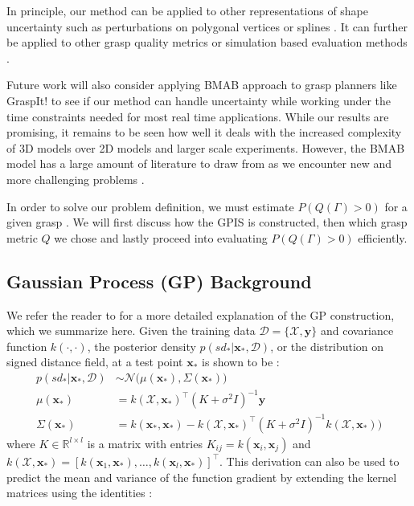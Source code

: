 \documentclass[journal,transmag]{IEEEtran}%
\newcommand{\by}{\mathbf{y}}
\newcommand{\bx}{\mathbf{x}}
\newcommand{\mX}{\mathcal{X}}
\newcommand{\mD}{\mathcal{D}}
\newcommand{\mN}{\mathcal{N}}
\begin{document}
In principle, our method can be applied to other representations of shape uncertainty such as perturbations on polygonal vertices \cite{kehoe2012estimating} or splines \cite{christopoulos2007handling}.
It can further be applied to other grasp quality metrics or simulation based evaluation methods \cite{73}. 

Future work will also consider applying BMAB approach to grasp planners like GraspIt! \cite{miller2004graspit} to see if our method can handle uncertainty while working under the time constraints needed for most real time applications. While our results are promising, it remains to be seen how well it deals with the increased complexity of 3D models over 2D models and larger scale experiments. However, the BMAB model has a large amount of literature to draw from as we encounter new and more challenging problems \cite{bergemann2006bandit}.





 \label{sec:Appendix}
 In order to solve our problem definition, we must estimate $P(Q(\Gamma)>0)$ for a given grasp . We will first discuss how the GPIS is constructed, then which grasp metric $Q$ we chose and lastly proceed into evaluating $P(Q(\Gamma)>0)$ efficiently. 


\subsection{Gaussian Process (GP) Background}\label{sec:GP}
We refer the reader to \cite{mahler2015opt} for a more detailed explanation of the GP construction, which we summarize here.  Given the training data $\mD = \{\mX, \by\}$ and covariance function $k(\cdot,\cdot)$, the posterior density $p(sd_*|\bx_*,\mD)$, or the distribution on signed distance field, at a test point $\bx_{*}$ is shown to be \cite{rasmussen2010gaussian}:
\begin{align*}
	p(sd_*|\bx_*,\mD) &\sim \mN\big(\mu(\bx_*), \Sigma(\bx_*)\big) \\
	\mu(\bx_*) &= k(\mX,\bx_*)^{\intercal}(K + \sigma^2I)^{-1}\by \\
	\Sigma(\bx_*) &= k(\bx_*,\bx_*)-k(\mX,\bx_*)^{\intercal}(K+\sigma^2I)^{-1}k(\mX,\bx_*)\big) 
\end{align*}
where $K \in \mathbb{R}^{l \times l}$ is a matrix with entries $K_{ij} = k(\bx_i,\bx_j)$ and $k(\mX,\bx_*) = [k(\bx_1,\bx_*),\ldots,k(\bx_l,\bx_*)]^{\intercal}$. 
This derivation can also be used to predict the mean and variance of the function gradient by extending the kernel matrices using the identities \cite{solak2003derivative}:
\end{document}
